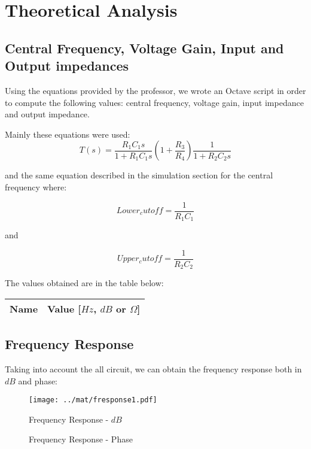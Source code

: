 \section{Theoretical Analysis}
\label{sec:analysis}

\subsection{Central Frequency, Voltage Gain, Input and Output impedances}
Using the equations provided by the professor, we wrote an Octave script in order to compute the following values: central frequency, voltage gain, input impedance and output impedance. \par
Mainly these equations were used:
\begin{equation}
    T(s) = \frac{R_1 C_1 s}{1+ R_1 C_1 s} (1+\frac{R_3}{R_4}) \frac{1}{1+ R_2 C_2 s}
\end{equation}\par
and the same equation described in the simulation section for the central frequency where: \par
\begin{equation}
    Lower_cutoff = \frac{1}{R_1 C_1}
\end{equation}\par
and \par
\begin{equation}
    Upper_cutoff = \frac{1}{R_2 C_2}
\end{equation}\par
The values obtained are in the table below:

\begin{center}
  \begin{tabular}{ | c | c | }
    \hline    
    {\bf Name} & {\bf Value [$Hz$, $dB$ or $\Omega$]} \\ \hline
    
    \hline
  \end{tabular}
\end{center}

\subsection{Frequency Response}
Taking into account the all circuit, we can obtain the frequency response both in $dB$ and phase:\par

\begin{figure}[H] \centering
\texttt{[image: ../mat/fresponse1.pdf]}
\caption{Frequency Response - $dB$}
\label{fig:fresponse1}
\end{figure}

\begin{figure}[H] \centering
\caption{Frequency Response - Phase}
\label{fig:fresponse2}
\end{figure}
